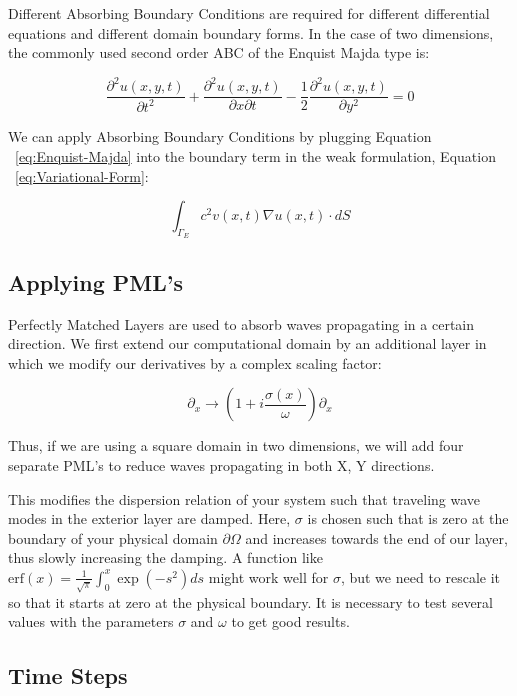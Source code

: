Different Absorbing Boundary Conditions are required for different differential equations and different domain boundary forms. In the case of two dimensions, the commonly used second order ABC of the Enquist Majda type is:

\begin{equation}
\frac{\partial^2 u(x,y,t)}{\partial t^2} + \frac{\partial^2 u(x,y,t)}{\partial x \partial t} - \frac{1}{2} \frac{\partial^2 u(x,y,t)}{\partial y^2} = 0
\label{eq:Enquist-Majda}
\end{equation}

We can apply Absorbing Boundary Conditions by plugging Equation ~\ref{eq:Enquist-Majda} into the boundary term in the weak formulation, Equation ~\ref{eq:Variational-Form}:

\begin{equation}
\int_{\Gamma_E} c^2 v(x,t) \nabla u(x,t) \cdot dS
\end{equation}



\subsection{Applying PML's}

Perfectly Matched Layers are used to absorb waves propagating in a certain direction. We first extend our computational domain by an additional layer in which we modify our derivatives by a complex scaling factor:

\begin{equation}
\partial_x \rightarrow \left( 1 + i \frac{\sigma(x)}{\omega} \right) \partial_x
\end{equation}

Thus, if we are using a square domain in two dimensions, we will add four separate PML's to reduce waves propagating in both X, Y directions.


This modifies the dispersion relation of your system such that traveling wave modes in the exterior layer are damped. Here, $\sigma$ is chosen such that is zero at the boundary of your physical domain $\partial \Omega$ and increases towards the end of our layer, thus slowly increasing the damping. A function like $\text{erf}(x)=\frac{1}{\sqrt{\pi}}\int_0^x \exp(−s^2) ds$ might work well for $\sigma$, but we need to rescale it so that it starts at zero at the physical boundary. It is necessary to test several values with the parameters $\sigma$ and $\omega$ to get good results.

\subsection{Time Steps}

